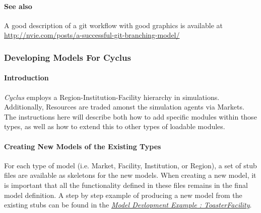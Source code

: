 \documentclass[letterpaper,10pt,english]{sphinxmanual}
\begin{document}
\paragraph{See also}
\label{devdoc/contributing_to_cyclus:see-also}
A good description of a git workflow with good graphics is available at
\href{http://nvie.com/posts/a-successful-git-branching-model/}{http://nvie.com/posts/a-successful-git-branching-model/}


\subsubsection{Developing Models For Cyclus}
\label{devdoc/make-models/main::doc}\label{devdoc/make-models/main:developing-models-for-cyclus}

\paragraph{Introduction}
\label{devdoc/make-models/main:introduction}
\emph{Cyclus} employs a Region-Institution-Facility hierarchy in simulations. Additionally,
Resources are traded amonst the simulation agents via Markets. The instructions here will
describe both how to add specific modules within those types, as well as how to extend this to
other types of loadable modules.


\paragraph{Creating New Models of the Existing Types}
\label{devdoc/make-models/main:creating-new-models-of-the-existing-types}
For each type of model (i.e. Market, Facility, Institution, or Region), a set of stub
files are available as skeletons for the new models.  When creating a new model, it is important that all the
functionality defined in these files remains in the final model definition. A
step by step example of producing a new model from the existing stubs can be
found in the {\hyperref[devdoc/make-models/toaster::doc]{\emph{Model Devlopment Example : ToasterFacility}}}.
\end{document}
